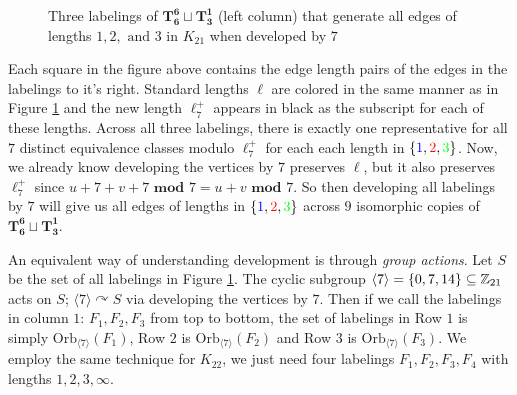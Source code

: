 \begin{figure}[H]
\begin{center}
    \end{center}
    \caption{Three labelings of $\mathbf{T_{6}^{6}}\sqcup \mathbf{T_{3}^{1}}$ (left column) that generate all edges of lengths $1,2,\text{ and }3$ in $K_{21}$ when developed by $7$}
    \label{fig:K21labelingex}
  \end{figure}

   Each square in the figure above contains the edge length pairs of the edges in the labelings to it's right. Standard lengths $\ell$ are colored in the same manner as in Figure \ref{fig:K21labelingex} and the new length $\ell_{7}^{+}$ appears in black as the subscript for each of these lengths. Across all three labelings, there is exactly one representative for all $7$ distinct equivalence classes modulo $\ell_{7}^{+}$ for each each length in $\{\textcolor{blue}{1},\textcolor{red}{2},\textcolor{green}{3}\}$. Now, we already know developing the vertices by $7$ preserves $\ell$, but it also preserves $\ell_{7}^{+}$ since $u+7+v+7\textbf{ mod }7=u+v\textbf{ mod }7$. So then developing all labelings by $7$ will give us all edges of lengths in $\{\textcolor{blue}{1},\textcolor{red}{2},\textcolor{green}{3}\}$ across $9$ isomorphic copies of $\mathbf{T_{6}^{6}}\sqcup \mathbf{T_{3}^{1}}$.
  
  An equivalent way of understanding development is through \textit{group actions}. Let $S$ be the set of all labelings in Figure \ref{fig:K21labelingex}. The cyclic subgroup $\langle 7\rangle=\{0,7,14\}\subseteq \mathbb{Z}_{21}$ acts on $S$; $\langle 7\rangle\curvearrowright S$ via developing the vertices by $7$. Then if we call the labelings in column $1$: $F_{1},F_{2},F_{3}$ from top to bottom, the set of labelings in Row $1$ is simply $\mathrm{Orb}_{\langle 7\rangle}(F_{1})$, Row $2$ is $\mathrm{Orb}_{\langle 7\rangle}(F_{2})$ and Row $3$ is $\mathrm{Orb}_{\langle 7 \rangle}(F_{3})$. We employ the same technique for $K_{22}$, we just need four labelings $F_{1},F_{2},F_{3},F_{4}$ with lengths $1,2,3,\infty$.

